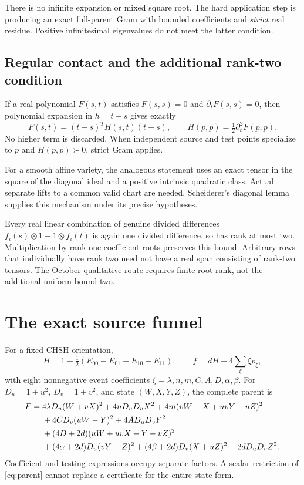 There is no infinite expansion or mixed square root. The hard application
step is producing an exact full-parent Gram with bounded coefficients
and \emph{strict} real residue. Positive infinitesimal eigenvalues do
not meet the latter condition. 

\subsection{Regular contact and the additional rank-two condition}

If a real polynomial \(F(s,t)\) satisfies
\(F(s,s)=0\) and \(\partial_tF(s,s)=0\), then polynomial expansion in
\(h=t-s\) gives exactly
\[
 F(s,t)=(t-s)^TH(s,t)(t-s),\qquad
 H(p,p)=\tfrac12\partial_t^2F(p,p).
\]
No higher term is discarded. When independent source and test points
specialize to \(p\) and \(H(p,p)\succ0\), strict Gram applies.

For a smooth affine variety, the analogous statement uses an exact
tensor in the square of the diagonal ideal and a positive intrinsic
quadratic class. Actual separate lifts to a common valid chart are
needed. Scheiderer's diagonal lemma supplies this mechanism under its
precise hypotheses. 

Every real linear combination of genuine divided differences
\(f_i(s)\otimes1-1\otimes f_i(t)\) is again one divided difference,
so has rank at most two. Multiplication by rank-one coefficient roots
preserves this bound. Arbitrary rows that individually have rank two
need not have a real span consisting of rank-two tensors.
The October qualitative route requires finite root rank, not the
additional uniform bound two.

\section{The exact source funnel}

For a fixed CHSH orientation,
\[
 H=1-\tfrac12(E_{00}-E_{01}+E_{10}+E_{11}),\qquad
 f=dH+4\sum_\xi \xi p_\xi,
\]
with eight nonnegative event coefficients
\(\xi=\lambda,n,m,C,A,D,\alpha,\beta\).
For \(D_u=1+u^2\), \(D_v=1+v^2\), and state \((W,X,Y,Z)\), the
complete parent is
\begin{align}
F={}&4\lambda D_u(W+vX)^2+4nD_uD_vX^2
 +4m(vW-X+uvY-uZ)^2 \notag\\
 &+4CD_v(uW-Y)^2+4AD_uD_vY^2 \notag\\
 &+(4D+2d)(uW+uvX-Y-vZ)^2 \notag\\
 &+(4\alpha+2d)D_u(vY-Z)^2
 +(4\beta+2d)D_v(X+uZ)^2-2dD_uD_vZ^2.
 \label{eq:parent}
\end{align}
Coefficient and testing expressions occupy separate factors.
A scalar restriction of \eqref{eq:parent} cannot replace a certificate
for the entire state form.

